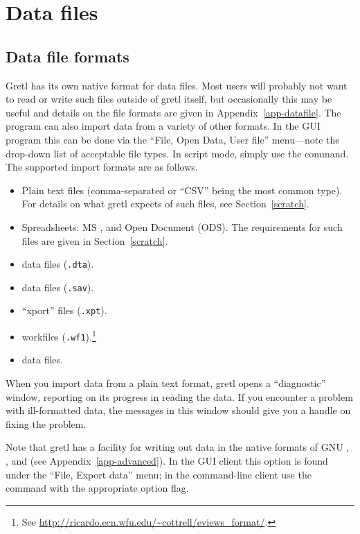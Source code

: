 \chapter{Data files}
\label{chap:datafiles}

\section{Data file formats}
\label{sec:data-formats}

Gretl has its own native format for data files.  Most users will
probably not want to read or write such files outside of gretl itself,
but occasionally this may be useful and details on the file formats
are given in Appendix~\ref{app-datafile}. The program can also import
data from a variety of other formats. In the GUI program this can be
done via the ``File, Open Data, User file'' menu---note the drop-down
list of acceptable file types. In script mode, simply use the
 command. The supported import formats are as follows.

\begin{itemize}
\item Plain text files (comma-separated or ``CSV'' being the most
  common type).  For details on what gretl expects of such files, see
  Section~\ref{scratch}.
\item Spreadsheets: MS ,  and Open Document
  (ODS). The requirements for such files are given in
  Section~\ref{scratch}.
\item {} data files (\texttt{.dta}).
\item {} data files (\texttt{.sav}).
\item {} ``xport'' files (\texttt{.xpt}).
\item {} workfiles (\texttt{.wf1}).\footnote{See
    \url{http://ricardo.ecn.wfu.edu/~cottrell/eviews_format/}.}
\item {} data files.
\end{itemize}

When you import data from a plain text format, gretl opens a
``diagnostic'' window, reporting on its progress in reading the data.
If you encounter a problem with ill-formatted data, the messages in
this window should give you a handle on fixing the problem.

Note that gretl has a facility for writing out data in the
native formats of GNU , ,  and
 (see Appendix~\ref{app-advanced}).  In the GUI client
this option is found under the ``File, Export data'' menu; in the
command-line client use the  command with the appropriate
option flag.

